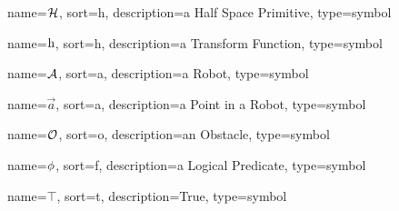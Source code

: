	{%
		name=\ensuremath{\set{H}},
		sort=h,
		description=a Half Space Primitive,
		type=symbol
	}
	\newcommand{\halfspaceprimitive}{\gls{sym:halfspaceprimitive}}

	{%
		name=\ensuremath{\func{h}},
		sort=h,
		description=a Transform Function,
		type=symbol
	}
	\newcommand{\transform}{\gls{sym:transform}}

	{%
		name=\ensuremath{\set{A}},
		sort=a,
		description=a Robot,
		type=symbol
	}
	\newcommand{\robot}{\gls{sym:robot}}

	{%
		name=\ensuremath{\vec{a}},
		sort=a,
		description=a Point in a Robot,
		type=symbol
	}
	\newcommand{\pointinrobot}{\gls{sym:pointinrobot}}

	{%
		name=\ensuremath{\set{O}},
		sort=o,
		description=an Obstacle,
		type=symbol
	}
	\newcommand{\obstacle}{\gls{sym:obstacle}}

	{%
		name=\ensuremath{\func{\phi}},
		sort=f,
		description=a Logical Predicate,
		type=symbol
	}
	\newcommand{\logicalpredicate}{\gls{sym:logicalpredicate}}

	{%
		name=\ensuremath{\top},
		sort=t,
		description=True,
		type=symbol
	}
	\newcommand{\true}{\gls{sym:true}}

